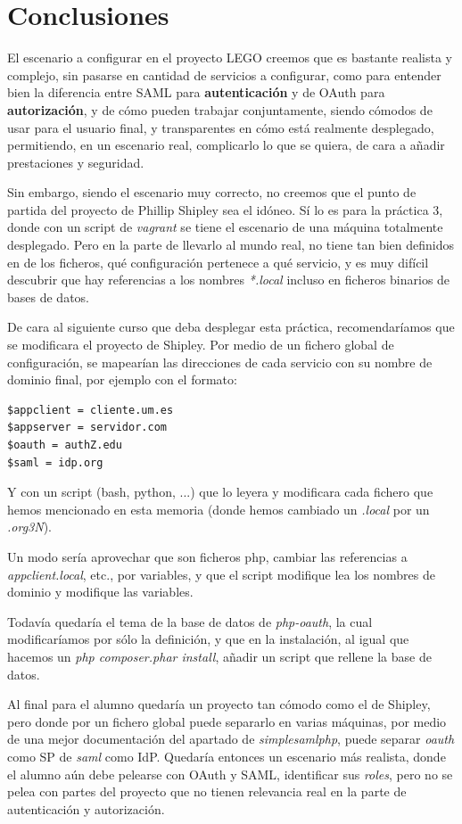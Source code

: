 \documentclass[]{article}
\begin{document}
\section{Conclusiones}

El escenario a configurar en el proyecto LEGO creemos que es bastante realista y complejo, sin pasarse en cantidad de servicios a configurar, como para entender bien la diferencia entre SAML para \textbf{autenticación} y de OAuth para \textbf{autorización}, y de cómo pueden trabajar conjuntamente, siendo cómodos de usar para el usuario final, y transparentes en cómo está realmente desplegado, permitiendo, en un escenario real, complicarlo lo que se quiera, de cara a añadir prestaciones y seguridad.

\hfill

Sin embargo, siendo el escenario muy correcto, no creemos que el punto de partida del proyecto de Phillip Shipley sea el idóneo. Sí lo es para la práctica 3, donde con un script de \textit{vagrant} se tiene el escenario de una máquina totalmente desplegado. Pero en la parte de llevarlo al mundo real, no tiene tan bien definidos en de los ficheros, qué configuración pertenece a qué servicio, y es muy difícil descubrir que hay referencias a los nombres \textit{*.local} incluso en ficheros binarios de bases de datos.

\hfill

De cara al siguiente curso que deba desplegar esta práctica, recomendaríamos que se modificara el proyecto de Shipley. Por medio de un fichero global de configuración, se mapearían las direcciones de cada servicio con su nombre de dominio final, por ejemplo con el formato:

\begin{verbatim}
$appclient = cliente.um.es
$appserver = servidor.com
$oauth = authZ.edu
$saml = idp.org
\end{verbatim} 

Y con un script (bash, python, ...) que lo leyera y modificara cada fichero que hemos mencionado en esta memoria (donde hemos cambiado un \textit{.local} por un \textit{.org3N}).

Un modo sería aprovechar que son ficheros php, cambiar las referencias a \textit{appclient.local}, etc., por variables, y que el script modifique lea los nombres de dominio y modifique las variables.

Todavía quedaría el tema de la base de datos de \textit{php-oauth}, la cual modificaríamos por sólo la definición, y que en la instalación, al igual que hacemos un \textit{php composer.phar install}, añadir un script que rellene la base de datos.


\hfill


Al final para el alumno quedaría un proyecto tan cómodo como el de Shipley, pero donde por un fichero global puede separarlo en varias máquinas, por medio de una mejor documentación del apartado de \textit{simplesamlphp}, puede separar \textit{oauth} como SP de \textit{saml} como IdP. Quedaría entonces un escenario más realista, donde el alumno aún debe pelearse con OAuth y SAML, identificar sus \textit{roles}, pero no se pelea con partes del proyecto que no tienen relevancia real en la parte de autenticación y autorización.
\end{document}
